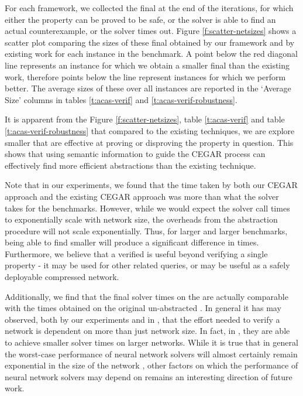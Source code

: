 For each framework, we collected the final \abs at the end of the \cegar
iterations, for which either the property can be proved to be safe, or 
the solver is able to find an actual counterexample, or the solver times out.  
Figure \ref{f:scatter-netsizes} shows a scatter plot comparing the sizes of
these final \abs obtained by our framework and by existing work \cite{cegar-nn}
for each instance in the benchmark.
A point below the red diagonal line represents an instance for which we obtain a
smaller final \abs than the existing work, therefore points below the line
represent instances for which we perform better.
The average sizes of these \abs over all instances are
reported in the `Average Size' columns in tables \ref{t:acas-verif} and
\ref{t:acas-verif-robustness}. 

It is apparent from the Figure \ref{f:scatter-netsizes}, 
table \ref{t:acas-verif} and table \ref{t:acas-verif-robustness} that compared 
to the existing techniques, we are explore smaller \abs that are effective 
at proving or disproving the property in question.
This shows that using semantic information to guide the CEGAR process can
effectively find more efficient abstractions than the existing technique.

Note that in our experiments, we found that the time taken by both our CEGAR
approach and the existing CEGAR approach \cite{cegar-nn} was more than what the
\neuralsat solver takes for the \acasxu benchmarks. However, while we would
expect the solver call times to exponentially scale with network size, the
overheads from the abstraction procedure will not scale exponentially. Thus, for
larger and larger benchmarks, being able to find smaller \abs will produce a
significant difference in times. Furthermore, we believe that a verified \abs is
useful beyond verifying a single property - it may be used for other related
queries, or may be useful as a safely deployable compressed network.

Additionally, we find that the final solver times on the \abs are actually
comparable with the times obtained on the original un-abstracted \cnc. In
general it has may observed, both by our experiments and in \cite{cegar-nn},
that the effort needed to verify a network is dependent
on more than just network size. In fact, in \cite{cegar-nn},
they are able to achieve smaller solver times on larger networks. 
While it is true that in general the worst-case performance of neural network
solvers will almost certainly remain exponential in the size of the network
\cite{reluplex}, other factors on which the performance of neural network
solvers may depend on remains an interesting direction of future work. 

